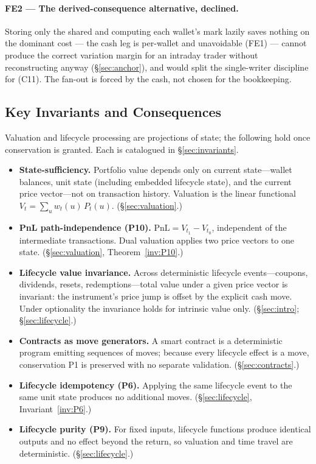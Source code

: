 \documentclass[11pt,a4paper]{article}
\begin{document}
\paragraph{FE2 --- The derived-consequence alternative, declined.} Storing only the shared
 and computing each wallet's mark lazily saves nothing on the dominant
cost --- the cash leg is per-wallet and unavoidable (FE1) --- cannot produce the correct variation
margin for an intraday trader without reconstructing \ac{} anyway (\S\ref{sec:anchor}), and would
split the single-writer discipline for \ac{} (C11). The fan-out is forced by the cash, not chosen for
the bookkeeping.

\subsection*{Key Invariants and Consequences}

Valuation and lifecycle processing are projections of state; the following hold once
conservation is granted. Each is catalogued in \S\ref{sec:invariants}.

\begin{itemize}[nosep]
\item \textbf{State-sufficiency.} Portfolio value depends only on current state---wallet
balances, unit state (including embedded lifecycle state), and the current price
vector---not on transaction history. Valuation is the linear functional
$V_t=\sum_u w_t(u)\,P_t(u)$. (\S\ref{sec:valuation}.)
\item \textbf{PnL path-independence (P10).} $\mathrm{PnL}=V_{t_1}-V_{t_0}$, independent of
the intermediate transactions. Dual valuation applies two price vectors to one state.
(\S\ref{sec:valuation}, Theorem~\ref{inv:P10}.)
\item \textbf{Lifecycle value invariance.} Across deterministic lifecycle
events---coupons, dividends, resets, redemptions---total value under a given price vector
is invariant: the instrument's price jump is offset by the explicit cash move. Under
optionality the invariance holds for intrinsic value only. (\S\ref{sec:intro}; \S\ref{sec:lifecycle}.)
\item \textbf{Contracts as move generators.} A smart contract is a deterministic program
emitting sequences of moves; because every lifecycle effect is a move, conservation P1 is
preserved with no separate validation. (\S\ref{sec:contracts}.)
\item \textbf{Lifecycle idempotency (P6).} Applying the same lifecycle event to the same
unit state produces no additional moves. (\S\ref{sec:lifecycle}, Invariant~\ref{inv:P6}.)
\item \textbf{Lifecycle purity (P9).} For fixed inputs, lifecycle functions produce
identical outputs and no effect beyond the return, so valuation and time travel are
deterministic. (\S\ref{sec:lifecycle}.)
\end{itemize}
\end{document}
